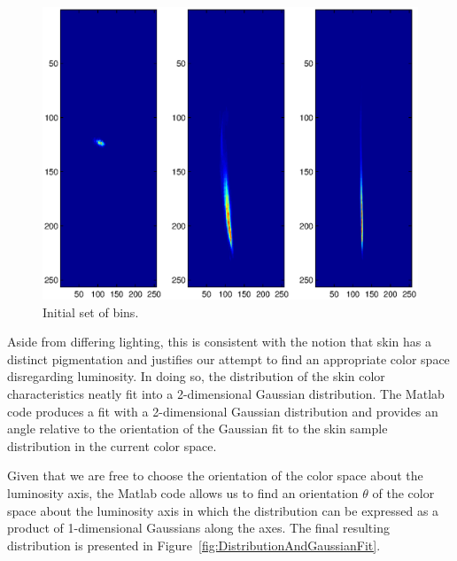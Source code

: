 \begin{figure}[h!]
  \centering
    \includegraphics[width=\textwidth]{Chapter2/Figs/InitialBins.eps}
    \caption{Initial set of bins.}  \label{fig:InitBins}
\end{figure}


Aside from differing lighting, this is consistent with the notion that skin has a distinct pigmentation and justifies our attempt to find an appropriate color space disregarding luminosity. In doing so, the distribution of the skin color characteristics neatly fit into a 2-dimensional Gaussian distribution. The Matlab code produces a fit with a 2-dimensional Gaussian distribution and provides an angle relative to the orientation of the Gaussian fit to the skin sample distribution in the current color space.

Given that we are free to choose the orientation of the color space about the luminosity axis, the Matlab code allows us to find an orientation $\theta$ of the color space about the luminosity axis in which the distribution can be expressed as a product of 1-dimensional Gaussians along the axes. The final resulting distribution is presented in Figure~\ref{fig:DistributionAndGaussianFit}.


